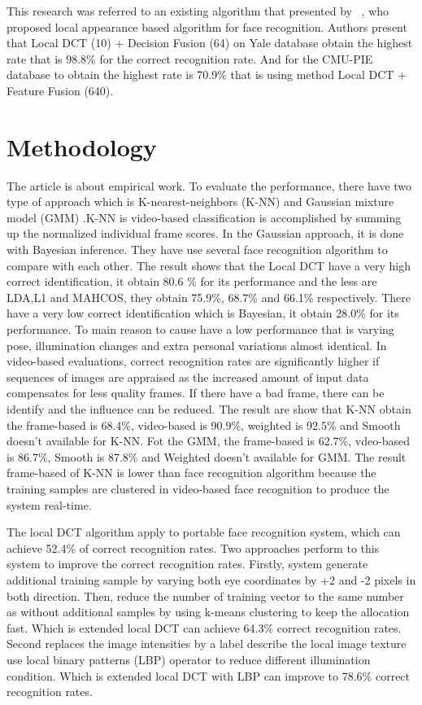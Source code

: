 \documentclass[a4paper,12pt]{article}
\begin{document}
This research was referred to an existing algorithm that presented by
~\cite{ekenel2005local}, who proposed local appearance based algorithm for face recognition. Authors present that Local DCT (10) + Decision Fusion (64) on Yale database obtain the highest rate that is 98.8\% for the correct recognition rate. And for the CMU-PIE database to obtain the highest rate is 70.9\% that is using method Local DCT + Feature Fusion (640).\\

\section{Methodology} 

The article is about empirical work. To evaluate the performance, there have two type of approach which is K-nearest-neighbors (K-NN) and Gaussian mixture model (GMM) .K-NN is video-based classification is accomplished by summing up the normalized individual frame scores. In the Gaussian approach, it is done with Bayesian inference.  They have use several face recognition algorithm to compare with each other. The result shows that the Local DCT have a very high correct identification, it obtain 80.6 \% for its performance and the less are LDA,L1 and MAHCOS, they obtain 75.9\%, 68.7\% and 66.1\% respectively. There have a very low correct identification which is Bayesian, it obtain 28.0\% for its performance. To main reason to cause have a low performance that is varying pose, illumination changes and extra personal variations almost identical.
In video-based evaluations, correct recognition rates are significantly higher if sequences of images are appraised as the increased amount of input data compensates for less quality frames. If there have a bad frame, there can be identify and the influence can be reduced. The result are show that K-NN obtain the frame-based is 68.4\%, video-based is 90.9\%, weighted is 92.5\% and Smooth doesn’t available for K-NN. Fot the GMM, the frame-based is 62.7\%, vdeo-based is 86.7\%, Smooth is 87.8\% and Weighted doesn’t available for GMM. The result frame-based of K-NN is lower than face recognition algorithm because the training samples are clustered in video-based face recognition to produce the system real-time. 

The local DCT algorithm apply to portable face recognition system, which can achieve 52.4\% of correct recognition rates. Two approaches perform to this system to improve the correct recognition rates. Firstly, system generate additional training sample by varying both eye coordinates by +2 and -2 pixels in both direction. Then, reduce the number of training vector to the same number as without additional samples by using k-means clustering to keep the allocation fast. Which is extended local DCT can achieve 64.3\% correct recognition rates. Second replaces the image intensities by a label describe the local image texture use local binary patterns (LBP) operator to reduce different illumination condition. Which is extended local DCT with LBP can improve to 78.6\% correct recognition rates. 
\end{document}
